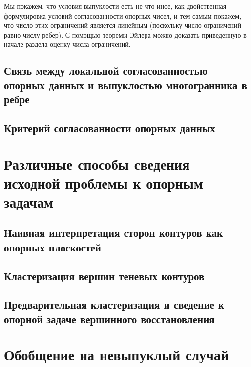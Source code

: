 \documentclass[a4paper, 12pt, titlepage]{article}
\theoremstyle{definition}
\theoremstyle{plain}
\theoremstyle{plain}
\begin{document}
Мы покажем, что условия выпуклости есть не что иное, как двойственная
формулировка условий согласованности опорных чисел, и тем самым покажем, что
число этих ограничений является линейным (поскольку число ограничений равно
числу ребер). С помощью теоремы Эйлера можно доказать приведенную в начале
раздела оценку числа ограничений.

\newpage
\subsection{Связь между локальной согласованностью опорных данных и выпуклостью
многогранника в ребре}

\subsection{Критерий согласованности опорных данных}


\section{Различные способы сведения исходной проблемы к опорным задачам}

\subsection{Наивная интерпретация сторон контуров как опорных плоскостей}

\subsection{Кластеризация вершин теневых контуров}

\subsection{Предварительная кластеризация и сведение к опорной задаче
вершинного восстановления}




\section{Обобщение на невыпуклый случай}

\newpage


\end{document}
